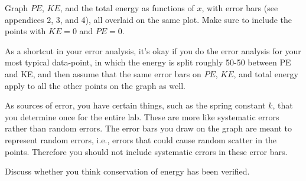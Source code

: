 \analysis

Graph $PE$, $KE$, and the total energy as functions of $x$,
with error bars (see appendices 2, 3, and 4), all overlaid
on the same plot. Make sure to include the points with $KE=0$ and
$PE=0$.

As a shortcut in your error analysis, it's okay if you
do the error analysis for your most typical data-point, in which
the energy is split roughly 50-50 between PE and KE, and then assume
that the same error bars on $PE$, $KE$, and total energy apply to
all the other points on the graph as well.

As sources of error, you have certain things, such as the spring constant $k$,
that you determine once for the entire lab. These are more like systematic
errors rather than random errors. The error bars you draw on the graph are
meant to represent random errors, i.e., errors that could cause random scatter
in the points. Therefore you should not include systematic errors in these
error bars.

Discuss whether you think conservation of
energy has been verified.
